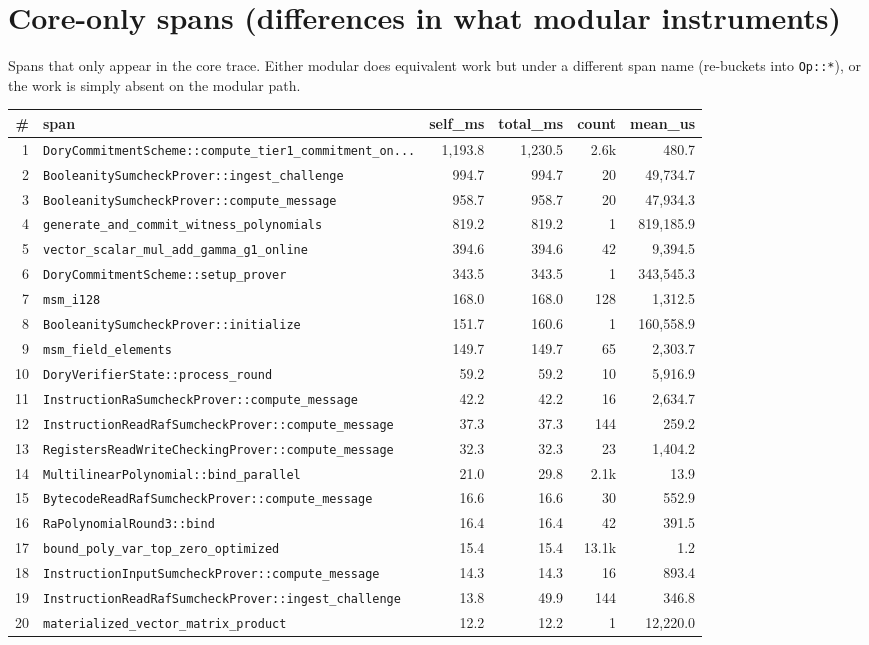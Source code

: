 \documentclass[10pt,a4paper]{article}
\begin{document}
\section{Core-only spans (differences in what modular instruments)}
Spans that only appear in the core trace. Either modular does equivalent work but under a different span name (re-buckets into \texttt{Op::*}), or the work is simply absent on the modular path.
\begin{longtable}{r l r r r r}
\toprule \textbf{\#} & \textbf{span} & \textbf{self\_ms} & \textbf{total\_ms} & \textbf{count} & \textbf{mean\_us} \\ \midrule \endhead
1 & \texttt{DoryCommitmentScheme::compute\_tier1\_commitment\_on...} & 1,193.8 & 1,230.5 & 2.6k & 480.7 \\
2 & \texttt{BooleanitySumcheckProver::ingest\_challenge} & 994.7 & 994.7 & 20 & 49,734.7 \\
3 & \texttt{BooleanitySumcheckProver::compute\_message} & 958.7 & 958.7 & 20 & 47,934.3 \\
4 & \texttt{generate\_and\_commit\_witness\_polynomials} & 819.2 & 819.2 & 1 & 819,185.9 \\
5 & \texttt{vector\_scalar\_mul\_add\_gamma\_g1\_online} & 394.6 & 394.6 & 42 & 9,394.5 \\
6 & \texttt{DoryCommitmentScheme::setup\_prover} & 343.5 & 343.5 & 1 & 343,545.3 \\
7 & \texttt{msm\_i128} & 168.0 & 168.0 & 128 & 1,312.5 \\
8 & \texttt{BooleanitySumcheckProver::initialize} & 151.7 & 160.6 & 1 & 160,558.9 \\
9 & \texttt{msm\_field\_elements} & 149.7 & 149.7 & 65 & 2,303.7 \\
10 & \texttt{DoryVerifierState::process\_round} & 59.2 & 59.2 & 10 & 5,916.9 \\
11 & \texttt{InstructionRaSumcheckProver::compute\_message} & 42.2 & 42.2 & 16 & 2,634.7 \\
12 & \texttt{InstructionReadRafSumcheckProver::compute\_message} & 37.3 & 37.3 & 144 & 259.2 \\
13 & \texttt{RegistersReadWriteCheckingProver::compute\_message} & 32.3 & 32.3 & 23 & 1,404.2 \\
14 & \texttt{MultilinearPolynomial::bind\_parallel} & 21.0 & 29.8 & 2.1k & 13.9 \\
15 & \texttt{BytecodeReadRafSumcheckProver::compute\_message} & 16.6 & 16.6 & 30 & 552.9 \\
16 & \texttt{RaPolynomialRound3::bind} & 16.4 & 16.4 & 42 & 391.5 \\
17 & \texttt{bound\_poly\_var\_top\_zero\_optimized} & 15.4 & 15.4 & 13.1k & 1.2 \\
18 & \texttt{InstructionInputSumcheckProver::compute\_message} & 14.3 & 14.3 & 16 & 893.4 \\
19 & \texttt{InstructionReadRafSumcheckProver::ingest\_challenge} & 13.8 & 49.9 & 144 & 346.8 \\
20 & \texttt{materialized\_vector\_matrix\_product} & 12.2 & 12.2 & 1 & 12,220.0 \\
\bottomrule \end{longtable}
\end{document}

